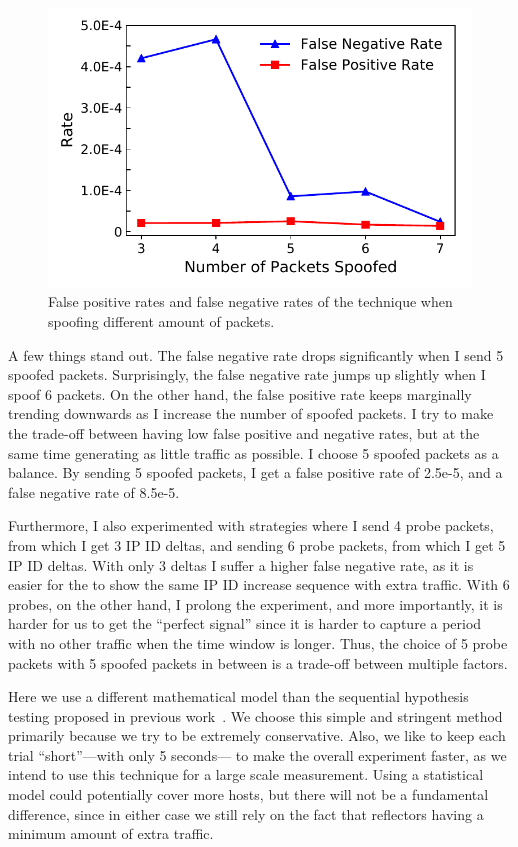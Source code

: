 \begin{figure}[t]
\centering
\includegraphics[width=0.85\columnwidth]{data_usage/images/false_positive_negative.pdf}
\caption{False positive rates and false negative rates of the technique when spoofing different amount of packets.}
\label{fig:fp_fn_analysis}
\end{figure}

A few things stand out. The false negative rate drops significantly when I
send 5 spoofed packets. Surprisingly, the false negative rate jumps up
slightly when I spoof 6 packets. On the other hand, the false positive rate
keeps marginally trending downwards as I increase the number of spoofed
packets. I try to make the trade-off between having low false positive and
negative rates, but at the same time generating as little traffic as possible.
I choose 5 spoofed packets as a balance. By sending 5 spoofed packets, I
get a false positive rate of 2.5e-5, and a false negative rate of 8.5e-5.

Furthermore, I also experimented with strategies where I send 4 probe packets, from which
I get 3 IP ID deltas, and sending 6 probe packets, from which I get 5 IP ID
deltas. With only 3 deltas I suffer a higher false negative rate, as it is
easier for the {} to show the same IP ID increase sequence with
extra traffic. With 6 probes, on the other hand, I prolong the experiment,
and more importantly, it is harder for us to get the ``perfect signal'' since
it is harder to capture a period with no other traffic when the time window
is longer. Thus, the choice of 5 probe packets with 5 spoofed packets in
between is a trade-off between multiple factors.

Here we use a different mathematical model than the sequential hypothesis testing proposed in previous work~\cite{pearce2017augur}.
We choose this simple and stringent method primarily because we try to be extremely conservative. Also, we like to
keep each trial “short”—with only 5 seconds— to make the
overall experiment faster, as we intend to use this technique
for a large scale measurement. Using a statistical model could
potentially cover more hosts, but there will not be a fundamental difference, since in either case we still rely on the fact
that reflectors having a minimum amount of extra traffic.

